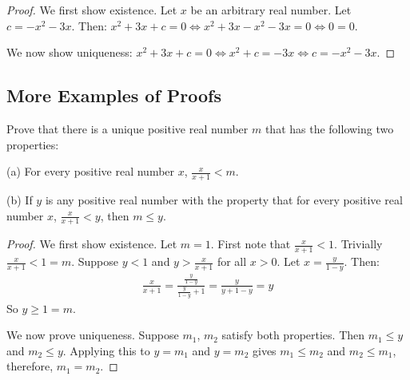 \begin{proof}
    We first show existence.
    Let $x$ be an arbitrary real number.
    Let $c = -x^2 - 3x$.
    Then: $x^2 + 3x + c = 0 \iff x^2 + 3x - x^2 - 3x = 0 \iff 0 = 0$.

    We now show uniqueness: $x^2 + 3x + c = 0 \iff x^2 + c = -3x \iff c = -x^2 -
        3x$.
\end{proof}

\subsection{More Examples of Proofs}

\begin{tcolorbox}[title=Problem 2, breakable]
    Prove that there is a unique positive real number $m$ that has the following two properties:

    (a) For every positive real number $x$, $\frac{x}{x + 1} < m$.

    (b) If $y$ is any positive real number with the property that for every positive real number $x$,
    $\frac{x}{x + 1} < y$, then $m \le y$.
\end{tcolorbox}

\begin{proof}
    We first show existence.
    Let $m = 1$. 
    First note that $\frac{x}{x + 1} < 1$.
    Trivially $\frac{x}{x + 1} < 1 = m$.
    Suppose $y < 1$ and $y > \frac{x}{x + 1}$ for all $x > 0$.
    Let $x = \frac{y}{1 - y}$.
    Then:
    \begin{align*}
        \frac{x}{x + 1} = \frac{\frac{y}{1-y}}{\frac{y}{1-y} + 1} = \frac{y}{y + 1 - y} = y
    \end{align*}
    So $y \ge 1 = m$.

    We now prove uniqueness. Suppose $m_1$, $m_2$ satisfy both properties. Then
    $m_1 \le y$ and $m_2 \le y$. Applying this to $y = m_1$ and $y = m_2$ gives
    $m_1 \le m_2$ and $m_2 \le m_1$, therefore, $m_1 = m_2$.
\end{proof}

